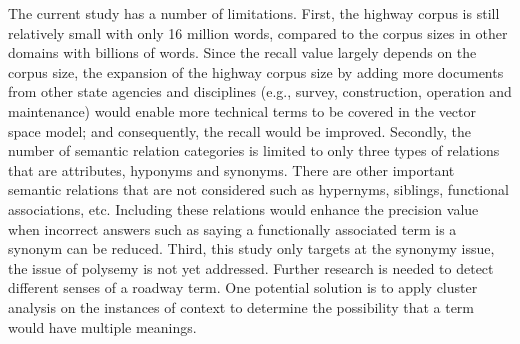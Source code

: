 \documentclass[Journal, BackFigs,NoLists, DoubleSpace]{ascelike}%
\begin{document}
\par
%
The current study has a number of limitations. First, the highway corpus is still relatively small with only 16 million words, compared to the corpus sizes in other domains with billions of words. Since the recall value largely depends on the corpus size, the expansion of the highway corpus size by adding more documents from other state agencies and disciplines (e.g., survey, construction, operation and maintenance) would enable more technical terms to be covered in the vector space model; and consequently, the recall would be improved. Secondly, the number of semantic relation categories is limited to only three types of relations that are attributes, hyponyms and synonyms. There are other important semantic relations that are not considered such as hypernyms, siblings, functional associations, etc. Including these relations would enhance the precision value when incorrect answers such as saying a functionally associated term is a synonym can be reduced. Third, this study only targets at the synonymy issue, the issue of polysemy is not yet addressed. Further research is needed to detect different senses of a roadway term. One potential solution is to apply cluster analysis on the instances of context to determine the possibility that a term would have multiple meanings. %
\end{document}
